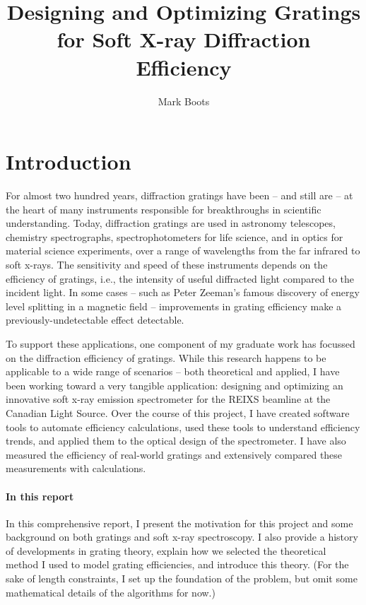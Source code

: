 \documentclass[singlespace,proposal]{uofsthesis-cs}
\title{Designing and Optimizing Gratings for Soft X-ray Diffraction Efficiency}
\author{Mark Boots}
\begin{document}
\maketitle

\frontmatter


\chapter{Introduction}

For almost two hundred years, diffraction gratings have been -- and still are -- at the heart of many instruments responsible for breakthroughs in scientific understanding.  Today, diffraction gratings are used in astronomy telescopes, chemistry spectrographs, spectrophotometers for life science, and in optics for material science experiments, over a range of wavelengths from the far infrared to soft x-rays.  The sensitivity and speed of these instruments depends on the efficiency of gratings, i.e., the intensity of useful diffracted light compared to the incident light.  In some cases -- such as Peter Zeeman's famous discovery of energy level splitting in a magnetic field -- improvements in grating efficiency make a previously-undetectable effect detectable.  

To support these applications, one component of my graduate work has focussed on the diffraction efficiency of gratings.  While this research happens to be applicable to a wide range of scenarios -- both theoretical and applied, I have been working toward a very tangible application: designing and optimizing an innovative soft x-ray emission spectrometer for the REIXS beamline at the Canadian Light Source.  Over the course of this project, I have created software tools to automate efficiency calculations, used these tools to understand efficiency trends, and applied them to the optical design of the spectrometer.  I have also measured the efficiency of real-world gratings and extensively compared these measurements with calculations.

\subsubsection{In this report}
In this comprehensive report, I present the motivation for this project and some background on both gratings and soft x-ray spectroscopy. I also provide a history of developments in grating theory, explain how we selected the theoretical method I used to model grating efficiencies, and introduce this theory.  (For the sake of length constraints, I set up the foundation of the problem, but omit some mathematical details of the algorithms for now.)
\end{document}
